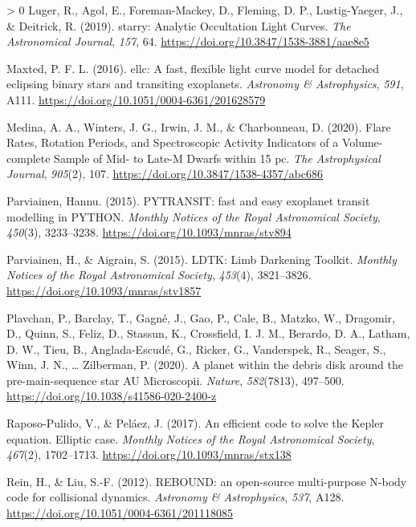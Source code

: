 \documentclass[10pt,a4paper,onecolumn]{article}
\newlength{\cslhangindent}
\newenvironment{CSLReferences}[3] %
 {%
  \setlength{\parindent}{0pt}
  \ifodd #1 \everypar{\setlength{\hangindent}{\cslhangindent}}\ignorespaces\fi
  \ifnum #2 > 0
  \setlength{\parskip}{#2\baselineskip}
  \fi
 }%
 {}
\begin{document}
\begin{CSLReferences}{1}{0}
\leavevmode\hypertarget{ref-luger19}{}%
Luger, R., Agol, E., Foreman-Mackey, D., Fleming, D. P., Lustig-Yaeger,
J., \& Deitrick, R. (2019). {starry: Analytic Occultation Light Curves}.
\emph{The Astronomical Journal}, \emph{157}, 64.
\url{https://doi.org/10.3847/1538-3881/aae8e5}

\leavevmode\hypertarget{ref-maxted16}{}%
Maxted, P. F. L. (2016). {ellc: A fast, flexible light curve model for
detached eclipsing binary stars and transiting exoplanets}.
\emph{Astronomy \& Astrophysics}, \emph{591}, A111.
\url{https://doi.org/10.1051/0004-6361/201628579}

\leavevmode\hypertarget{ref-medina20}{}%
Medina, A. A., Winters, J. G., Irwin, J. M., \& Charbonneau, D. (2020).
{Flare Rates, Rotation Periods, and Spectroscopic Activity Indicators of
a Volume-complete Sample of Mid- to Late-M Dwarfs within 15 pc}.
\emph{The Astrophysical Journal}, \emph{905}(2), 107.
\url{https://doi.org/10.3847/1538-4357/abc686}

\leavevmode\hypertarget{ref-parviainen15}{}%
Parviainen, Hannu. (2015). {PYTRANSIT: fast and easy exoplanet transit
modelling in PYTHON}. \emph{Monthly Notices of the Royal Astronomical
Society}, \emph{450}(3), 3233--3238.
\url{https://doi.org/10.1093/mnras/stv894}

\leavevmode\hypertarget{ref-parviainen15b}{}%
Parviainen, H., \& Aigrain, S. (2015). {LDTK: Limb Darkening Toolkit}.
\emph{Monthly Notices of the Royal Astronomical Society}, \emph{453}(4),
3821--3826. \url{https://doi.org/10.1093/mnras/stv1857}

\leavevmode\hypertarget{ref-plavchan20}{}%
Plavchan, P., Barclay, T., Gagné, J., Gao, P., Cale, B., Matzko, W.,
Dragomir, D., Quinn, S., Feliz, D., Stassun, K., Crossfield, I. J. M.,
Berardo, D. A., Latham, D. W., Tieu, B., Anglada-Escudé, G., Ricker, G.,
Vanderspek, R., Seager, S., Winn, J. N., \ldots{} Zilberman, P. (2020).
{A planet within the debris disk around the pre-main-sequence star AU
Microscopii}. \emph{Nature}, \emph{582}(7813), 497--500.
\url{https://doi.org/10.1038/s41586-020-2400-z}

\leavevmode\hypertarget{ref-raposo17}{}%
Raposo-Pulido, V., \& Peláez, J. (2017). {An efficient code to solve the
Kepler equation. Elliptic case}. \emph{Monthly Notices of the Royal
Astronomical Society}, \emph{467}(2), 1702--1713.
\url{https://doi.org/10.1093/mnras/stx138}

\leavevmode\hypertarget{ref-rein12}{}%
Rein, H., \& Liu, S.-F. (2012). {REBOUND: an open-source multi-purpose
N-body code for collisional dynamics}. \emph{Astronomy \& Astrophysics},
\emph{537}, A128. \url{https://doi.org/10.1051/0004-6361/201118085}


\end{CSLReferences}
\end{document}
